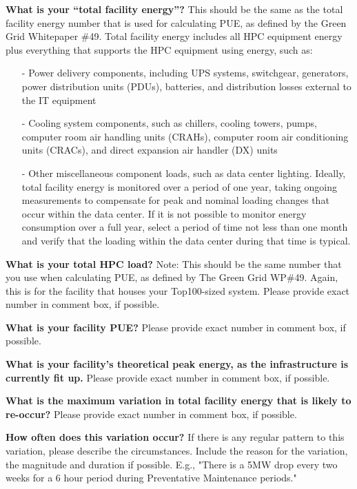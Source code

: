 \noindent
\textbf{What is your ``total facility energy''?}
This should be the same as the total facility energy number that is used for calculating PUE, 
as defined by the Green Grid Whitepaper \#49.  Total facility energy includes all 
HPC equipment energy plus everything that supports the HPC equipment using energy, such as:
\begin{itemize}
\item[{-}]
Power delivery components, including UPS systems, switchgear, generators, power 
distribution units (PDUs), batteries, and distribution losses external to the IT equipment  
\item[{-}]
Cooling system components, such as chillers, cooling towers, pumps, computer 
room air handling units (CRAHs), computer room air conditioning units (CRACs), and direct 
expansion air handler (DX) units  
\item[{-}]
Other miscellaneous component loads, such as data center lighting.
Ideally, total facility energy is monitored over a period of one year, taking 
ongoing measurements to compensate for peak and nominal loading changes that occur within the data 
center. If it is not possible to monitor energy consumption over a full year, select a period 
of time not less than one month and verify that the loading within the data center 
during that time is typical.	
\end{itemize}

\wl
\noindent
\textbf{What is your total HPC load?}
Note:  This should be the same number that you use when calculating PUE, as defined by 
The Green Grid WP\#49.  Again, this is for the facility that houses your Top100-sized system.  	
Please provide exact number in comment box, if possible.	

\wl
\noindent
\textbf{What is your facility PUE?}
Please provide exact number in comment box, if possible.

\wl
\noindent
\textbf{What is your facility's theoretical peak energy, as the infrastructure is currently fit up.}
Please provide exact number in comment box, if possible.	

\wl
\noindent
\textbf{What is the maximum variation in total facility energy that is likely to re-occur?}
Please provide exact number in comment box, if possible.

\wl
\noindent
\textbf{How often does this variation occur?}
If there is any regular pattern to this variation, please describe the circumstances.  
Include the reason for the variation, the magnitude and duration if possible.  
E.g., "There is a 5MW drop every two weeks for a 6 hour period during Preventative Maintenance 
periods." 

